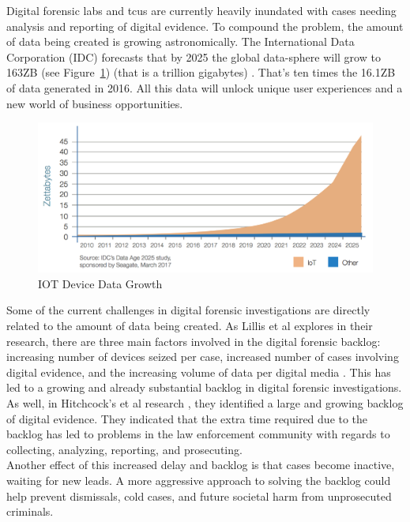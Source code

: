 \documentclass[12pt]{article}
\begin{document}
Digital forensic labs and \glspl{tcu} are currently heavily inundated with cases needing
analysis and reporting of digital evidence.  To compound the problem, the amount of
data being created is growing astronomically.  The International Data Corporation
(IDC) forecasts that by 2025 the global data-sphere will grow to 163ZB (see
Figure~\ref{fig:IOT}) (that is a trillion gigabytes) \cite{IDCDataAge2017}. That's ten times the 16.1ZB
of data generated in 2016. All this data will unlock unique user experiences and
a new world of business opportunities.\\

\begin{figure}[H]
  \centering
    \includegraphics[width=\textwidth]{images/IOT_chart.jpg}
  \caption{IOT Device Data Growth}
  \label{fig:IOT}
\end{figure}

Some of the current challenges in digital forensic investigations are directly
related to the amount of data being created.  As Lillis et al
explores in their research, there are three main factors involved in the digital
forensic backlog: increasing number of devices seized per case, increased number of
cases involving digital evidence, and the increasing volume of data per digital
media \cite{lillis2016current}.  This has led to a growing and already substantial
backlog in digital forensic investigations.\\

As well, in Hitchcock's et al research \cite{hitchcock2016tiered}, they identified
a large and growing backlog of digital evidence.  They indicated that the extra
time required due to the backlog has led to problems in the law enforcement
community with regards to collecting, analyzing, reporting, and prosecuting.\\

Another effect of this increased delay and backlog is that cases become inactive,
waiting for new leads.  A more aggressive approach to solving the backlog could
help prevent dismissals, cold cases, and future societal harm from unprosecuted 
criminals.\\
\end{document}
